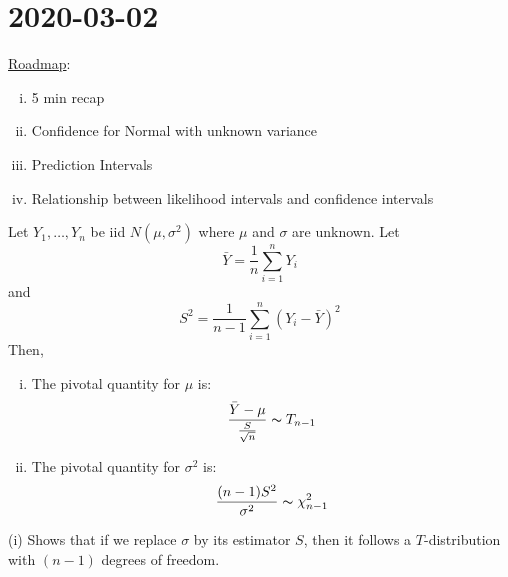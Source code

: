 \section{2020-03-02}
\underline{Roadmap}:
\begin{enumerate}[(i)]
    \item 5 min recap
    \item Confidence for Normal with unknown variance
    \item Prediction Intervals
    \item Relationship between likelihood intervals and confidence intervals
\end{enumerate}

\begin{thmbox}
    \begin{theorem}
        Let $ Y_1,\ldots ,Y_n $ be iid $ N(\mu,\sigma^2) $ where $ \mu $ and $ \sigma $ are
        unknown. Let
        \[ \bar{Y}=\frac{1}{n} \sum\limits_{i=1}^{n} Y_i \]
        and
        \[ S^2=\frac{1}{n-1} \sum\limits_{i=1}^{n} (Y_i-\bar{Y})^2 \]
        Then,
        \begin{enumerate}[(i)]
            \item The pivotal quantity for $ \mu $ is:
                  \[ \frac{\bar{Y}-\mu}{\frac{S}{\sqrt{n}}} \thicksim T_{n-1}  \]
            \item The pivotal quantity for $ \sigma^2 $ is:
                  \[ \frac{(n-1)S^2}{\sigma^2} \thicksim \chi^2_{n-1}  \]
        \end{enumerate}
    \end{theorem}
\end{thmbox}
\begin{remark}
    (i) Shows that if we replace $ \sigma $ by its estimator $ S $, then it follows a $ T $-distribution
    with $ (n-1) $ degrees of freedom.
\end{remark}

